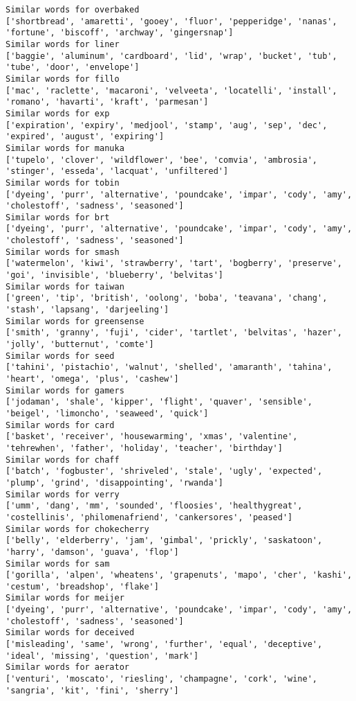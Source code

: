 \documentclass[11pt]{article}
\begin{document}
\begin{Verbatim}[commandchars=\\\{\}]
Similar words for overbaked
['shortbread', 'amaretti', 'gooey', 'fluor', 'pepperidge', 'nanas', 'fortune', 'biscoff', 'archway', 'gingersnap']
Similar words for liner
['baggie', 'aluminum', 'cardboard', 'lid', 'wrap', 'bucket', 'tub', 'tube', 'door', 'envelope']
Similar words for fillo
['mac', 'raclette', 'macaroni', 'velveeta', 'locatelli', 'install', 'romano', 'havarti', 'kraft', 'parmesan']
Similar words for exp
['expiration', 'expiry', 'medjool', 'stamp', 'aug', 'sep', 'dec', 'expired', 'august', 'expiring']
Similar words for manuka
['tupelo', 'clover', 'wildflower', 'bee', 'comvia', 'ambrosia', 'stinger', 'esseda', 'lacquat', 'unfiltered']
Similar words for tobin
['dyeing', 'purr', 'alternative', 'poundcake', 'impar', 'cody', 'amy', 'cholestoff', 'sadness', 'seasoned']
Similar words for brt
['dyeing', 'purr', 'alternative', 'poundcake', 'impar', 'cody', 'amy', 'cholestoff', 'sadness', 'seasoned']
Similar words for smash
['watermelon', 'kiwi', 'strawberry', 'tart', 'bogberry', 'preserve', 'goi', 'invisible', 'blueberry', 'belvitas']
Similar words for taiwan
['green', 'tip', 'british', 'oolong', 'boba', 'teavana', 'chang', 'stash', 'lapsang', 'darjeeling']
Similar words for greensense
['smith', 'granny', 'fuji', 'cider', 'tartlet', 'belvitas', 'hazer', 'jolly', 'butternut', 'comte']
Similar words for seed
['tahini', 'pistachio', 'walnut', 'shelled', 'amaranth', 'tahina', 'heart', 'omega', 'plus', 'cashew']
Similar words for gamers
['jodaman', 'shale', 'kipper', 'flight', 'quaver', 'sensible', 'beigel', 'limoncho', 'seaweed', 'quick']
Similar words for card
['basket', 'receiver', 'housewarming', 'xmas', 'valentine', 'tehrewhen', 'father', 'holiday', 'teacher', 'birthday']
Similar words for chaff
['batch', 'fogbuster', 'shriveled', 'stale', 'ugly', 'expected', 'plump', 'grind', 'disappointing', 'rwanda']
Similar words for verry
['umm', 'dang', 'mm', 'sounded', 'floosies', 'healthygreat', 'costellinis', 'philomenafriend', 'cankersores', 'peased']
Similar words for chokecherry
['belly', 'elderberry', 'jam', 'gimbal', 'prickly', 'saskatoon', 'harry', 'damson', 'guava', 'flop']
Similar words for sam
['gorilla', 'alpen', 'wheatens', 'grapenuts', 'mapo', 'cher', 'kashi', 'cestum', 'breadshop', 'flake']
Similar words for meijer
['dyeing', 'purr', 'alternative', 'poundcake', 'impar', 'cody', 'amy', 'cholestoff', 'sadness', 'seasoned']
Similar words for deceived
['misleading', 'same', 'wrong', 'further', 'equal', 'deceptive', 'ideal', 'missing', 'question', 'mark']
Similar words for aerator
['venturi', 'moscato', 'riesling', 'champagne', 'cork', 'wine', 'sangria', 'kit', 'fini', 'sherry']

\end{Verbatim}
\end{document}
